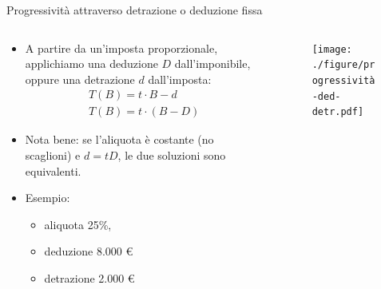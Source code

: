 \documentclass[aspectratio=64,12pt]{beamer}
\newcommand\€{\,\text{€}}
\begin{document}
\begin{frame}{Progressività attraverso detrazione o deduzione fissa}
\begin{columns}
\begin{column}{.4\columnwidth}
\small
\begin{itemize}
\item A partire da un'imposta proporzionale, applichiamo una deduzione $D$
  dall'imponibile, oppure una detrazione $d$ dall'imposta:
  \vspace{-3mm}
  \begin{gather*}
    T(B) = t\cdot B - d \\
    T(B)=t\cdot (B-D)
  \end{gather*}
\item Nota bene: se l'aliquota è costante (no scaglioni) e $d=tD$, le due
  soluzioni sono equivalenti.
\item Esempio:
\begin{itemize}
\item aliquota 25\%,
\item deduzione 8.000 €
\item detrazione 2.000 €
\end{itemize}
\end{itemize}
\end{column}

\begin{column}{.6\columnwidth}
\begin{figure}
\centering
\texttt{[image: ./figure/progressività-ded-detr.pdf]}
\end{figure}
\end{column}
\end{columns}
\end{frame}
\end{document}
